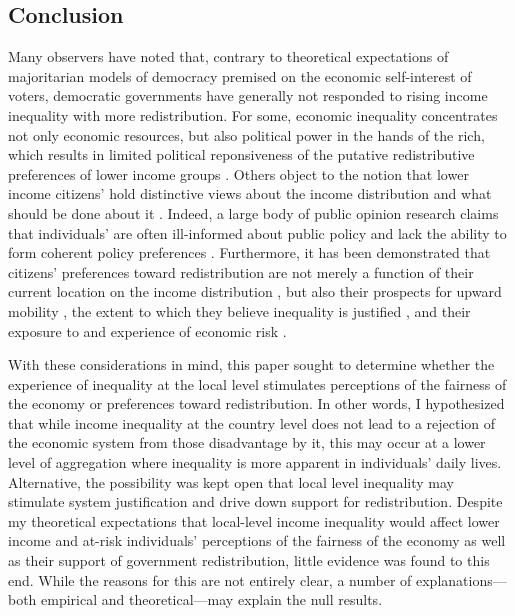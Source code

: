 \documentclass[12pt, letter]{scrartcl}
\begin{document}
\subsection{Conclusion}

Many observers have noted that, contrary to theoretical expectations of majoritarian models of democracy premised on the economic self-interest of voters, democratic governments have generally not responded to rising income inequality with more redistribution. For some, economic inequality concentrates not only economic resources, but also political power in the hands of the rich, which results in limited political reponsiveness of the putative redistributive preferences of lower income groups \parencite{bartels2008unequal, gilens2012affluence}. Others object to the notion that lower income citizens' hold distinctive views about the income distribution and what should be done about it \parencite{soroka2008limits}. Indeed, a large body of public opinion research claims that individuals' are often ill-informed about public policy and lack the ability to form coherent policy preferences \parencite{kuklinski2000reconsidering, sniderman2000taking, achen2017democracy}. Furthermore, it has been demonstrated that citizens' preferences toward redistribution are not merely a function of their current location on the income distribution \parencite{meltzer1981rational}, but also their prospects for upward mobility \parencite{benabou2001social}, the extent to which they believe inequality is justified \parencite{alesina2009preferences, trump2017income}, and their exposure to and experience of economic risk \parencite{rehm2009risks}. 

With these considerations in mind, this paper sought to determine whether the experience of inequality at the local level stimulates perceptions of the fairness of the economy or preferences toward redistribution. In other words, I hypothesized that while income inequality at the country level does not lead to a rejection of the economic system from those disadvantage by it, this may occur at a lower level of aggregation where inequality is more apparent in individuals' daily lives. Alternative, the possibility was kept open that local level inequality may stimulate system justification and drive down support for redistribution. Despite my theoretical expectations that local-level income inequality would affect lower income and at-risk individuals' perceptions of the fairness of the economy as well as their support of government redistribution, little evidence was found to this end. While the reasons for this are not entirely clear, a number of explanations---both empirical and theoretical---may explain the null results.
\end{document}

